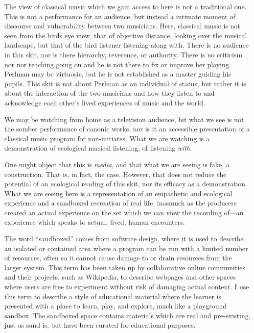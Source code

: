 \documentclass[12pt,letterpaper]{article}
\begin{document}
	The view of classical music which we gain access to here is not a
	traditional one. This is not a performance for an audience, but instead
	a intimate moment of discourse and vulnerability between two 
	musicians. Here, classical music is not seen from the birds eye view,
	that of 
	objective distance, looking over the musical landscape, but that of the 
	bird listener listening along with. There is no audience in this skit, 
	nor is there hierarchy, reverence, or authority. There is no criticism
	nor nor teaching going on and he is not there to fix or improve her
	playing. Perlman may be
	virtuosic, but he is not established as a master guiding his pupils.
	This skit is not about Perlman as an individual of status, but rather
	it is about the interaction of the two musicians and how they listen to 
	and acknowledge each other's lived experiences of music and the world. 
	
	We may be watching from home as a television audience, bit what we see
	is not the somber performance of canonic works, nor is it an accessible
	presentation of a classical music program for non-initiates. What we 
	are watching is a demonstration of ecological musical listening, of 
	listening \textit{with}. 

	One might object that this is \textit{media}, and that what we are
	seeing is fake, a construction. That is, in fact, the case. However, 
	that does not reduce the potential of an ecological reading of this 
	skit, nor its efficacy as a demonstration. What we are seeing here is a 
	representation of an empathetic and ecological experience and a 
	sandboxed recreation of real life, inasmuch as the producers created an
	actual experience on the set which we can view the recording of---an 
	experience which speaks to actual, lived, human encounters. 

	The word ``sandboxed'' comes from software design, where it is used
	to describe an isolated or contained area where a program can be run 
	with a limited number of resources, often so it cannot cause damage to
	or drain resources from the larger system. This term has been taken up
	by collaborative online communities and their projects, such as 
	Wikipedia, to describe webpages and other spaces where users are free 
	to experiment without risk of damaging actual 
	content.\autocite{Wiktionary} I use this term
	to describe a style of educational material where the learner is
	presented with a place to learn, play, and explore, much like a
	playground sandbox. The sandboxed space contains materials which are
	real and pre-existing, just as sand is, but have been curated for 
	educational purposes.
	
\end{document}
